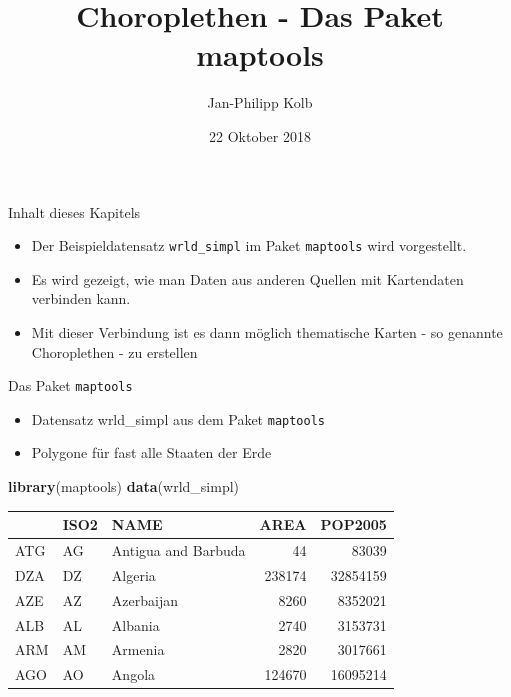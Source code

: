 \documentclass[ignorenonframetext,]{beamer}
\title{Choroplethen - Das Paket maptools}
\author{Jan-Philipp Kolb}
\date{22 Oktober 2018}
\newenvironment{Shaded}{\begin{snugshade}}{\end{snugshade}}
\newcommand{\KeywordTok}[1]{\textcolor[rgb]{0.13,0.29,0.53}{\textbf{#1}}}
\newcommand{\NormalTok}[1]{#1}
\providecommand{\tightlist}{%
  \setlength{\itemsep}{0pt}\setlength{\parskip}{0pt}}
\begin{document}
\frame{\titlepage}

\begin{frame}[fragile]{Inhalt dieses Kapitels}
\protect\hypertarget{inhalt-dieses-kapitels}{}

\begin{itemize}
\tightlist
\item
  Der Beispieldatensatz \texttt{wrld\_simpl} im Paket \texttt{maptools}
  wird vorgestellt.
\item
  Es wird gezeigt, wie man Daten aus anderen Quellen mit Kartendaten
  verbinden kann.
\item
  Mit dieser Verbindung ist es dann möglich thematische Karten - so
  genannte Choroplethen - zu erstellen
\end{itemize}

\end{frame}

\begin{frame}[fragile]{Das Paket \texttt{maptools}}
\protect\hypertarget{das-paket-maptools}{}

\begin{itemize}
\tightlist
\item
  Datensatz wrld\_simpl aus dem Paket \texttt{maptools}
\item
  Polygone für fast alle Staaten der Erde
\end{itemize}

\begin{Shaded}
\begin{Highlighting}[]
\KeywordTok{library}\NormalTok{(maptools)}
\KeywordTok{data}\NormalTok{(wrld_simpl)}
\end{Highlighting}
\end{Shaded}

\begin{longtable}[]{@{}lllrr@{}}
\toprule
& ISO2 & NAME & AREA & POP2005\tabularnewline
\midrule
\endhead
ATG & AG & Antigua and Barbuda & 44 & 83039\tabularnewline
DZA & DZ & Algeria & 238174 & 32854159\tabularnewline
AZE & AZ & Azerbaijan & 8260 & 8352021\tabularnewline
ALB & AL & Albania & 2740 & 3153731\tabularnewline
ARM & AM & Armenia & 2820 & 3017661\tabularnewline
AGO & AO & Angola & 124670 & 16095214\tabularnewline
\bottomrule
\end{longtable}

\end{frame}
\end{document}
